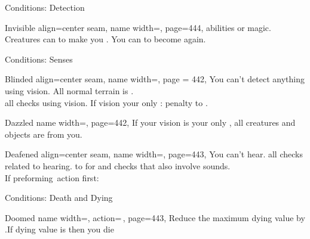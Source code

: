 \begin{PageFront}
\begin{Tables}{\frontTableHeight}
\begin{Table}{Conditions: Detection}
\begin{entry}{Invisible}{%
                align=center seam,
                name width=\conditionLength,%
                page=444,
            }
{                abilities or magic.} \\
                Creatures can  to make you \Hidden. You can  to become \Undetected again.
                \hfill {}
            \end{entry}
        \end{Table}
        \TableSpace
        \begin{Table}{Conditions: Senses}
            \begin{entry}{Blinded}{%
                align=center seam,
                name width=\conditionLength,%
                page = 442,
            }
                You can't detect anything using vision. All normal terrain is .
                \hfill {} \\
                 all \PerceptionT checks using vision. If vision your only \PreciseSense:  \Status penalty to \PerceptionT.\hfill {}
            \end{entry}
            \begin{entry}{Dazzled}{%
                name width=\conditionLength,%
                page=442,
            }
                If your vision is your only \PreciseSense, all creatures and objects are \Concealed from you.
            \end{entry}
            \begin{entry}{Deafened}{%
                align=center seam,
                name width=\conditionLength,%
                page=443,
            }
                You can't hear. \hfill{} all checks \PerceptionT related to hearing. \hfill {} to \PerceptionT for  and checks that also involve sounds. \\
                If preforming \Auditory\,action first: \Flat[][val=5]  \hfill {}
            \end{entry}
        \end{Table}
        \TableSpace
        \begin{Table}{Conditions: Death and Dying}
            \begin{entry}{Doomed}{%
                name width=\conditionLength,%
                action=\,\X,
                page=443,
            }
                Reduce the maximum dying value by \X.\quad If dying value is  then you die

\end{entry}
\end{Table}
\end{Tables}
\end{PageFront}
